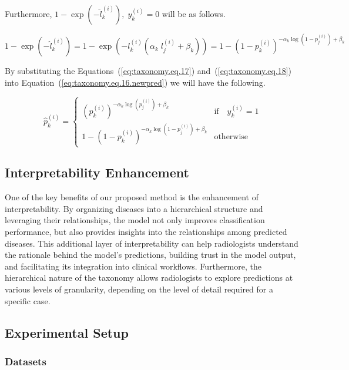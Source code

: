 Furthermore, $1-\exp{\left(-{\widehat l}_k^{(i)}\right)},\;y_k^{(i)}=0 $ will be as follows.

\begin{equation}
    \label{eq:taxonomy.eq.18}
    1-\exp{\left(-{\widehat l}_k^{(i)}\right)}=1-\exp{\left(-l_k^{(i)}\left(\alpha_k\;l_j^{(i)}+\beta_k\right)\right)}={1-\left(1-p_k^{(i)}\right)}^{-\alpha_k{\log{\left(1-p_j^{(i)}\right)}}+\beta_k}
\end{equation}


By substituting the Equations~(\ref{eq:taxonomy.eq.17}) and~(\ref{eq:taxonomy.eq.18})  into Equation~(\ref{eq:taxonomy.eq.16.newpred})  we will have the following.


\begin{equation}
    \label{eq:taxonomy.eq.19.newpred}
    \widehat{p}_k^{(i)} =
    \begin{cases}
        {\left( p_k^{(i)} \right)}^{-\alpha_k \log(p_j^{(i)}) + \beta_k} & \text{if} \quad y_k^{(i)} = 1 \\
        1 - {\left( 1 - p_k^{(i)} \right)}^{-\alpha_k \log{\left( 1 - p_j^{(i)} \right)} + \beta_k} & \text{otherwise}
    \end{cases}
\end{equation}


\subsection{Interpretability Enhancement}

One of the key benefits of our proposed method is the enhancement of interpretability. By organizing diseases into a hierarchical structure and leveraging their relationships, the model not only improves classification performance, but also provides insights into the relationships among predicted diseases. This additional layer of interpretability can help radiologists understand the rationale behind the model's predictions, building trust in the model output, and facilitating its integration into clinical workflows. Furthermore, the hierarchical nature of the taxonomy allows radiologists to explore predictions at various levels of granularity, depending on the level of detail required for a specific case.



\subsection{Experimental Setup}


\subsubsection{Datasets}

